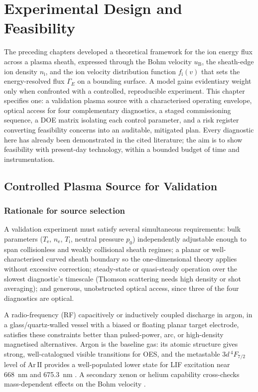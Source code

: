 \chapter{Experimental Design and Feasibility}
\label{ch:experiment}

The preceding chapters developed a theoretical framework for the ion energy flux across a plasma sheath, expressed through the Bohm velocity $u_{\mathrm{B}}$, the sheath-edge ion density $n_{\mathrm{i}}$, and the ion velocity distribution function $f_{\mathrm{i}}(v)$ that sets the energy-resolved flux $\Gamma_{E}$ on a bounding surface. A model gains evidentiary weight only when confronted with a controlled, reproducible experiment. This chapter specifies one: a validation plasma source with a characterised operating envelope, optical access for four complementary diagnostics, a staged commissioning sequence, a DOE matrix isolating each control parameter, and a risk register converting feasibility concerns into an auditable, mitigated plan. Every diagnostic here has already been demonstrated in the cited literature; the aim is to show feasibility with present-day technology, within a bounded budget of time and instrumentation.

\section{Controlled Plasma Source for Validation}

\subsection{Rationale for source selection}

A validation experiment must satisfy several simultaneous requirements: bulk parameters ($T_{\mathrm{e}}$, $n_{\mathrm{e}}$, $T_{\mathrm{i}}$, neutral pressure $p_{0}$) independently adjustable enough to span collisionless and weakly collisional sheath regimes; a planar or well-characterised curved sheath boundary so the one-dimensional theory applies without excessive correction; steady-state or quasi-steady operation over the slowest diagnostic's timescale (Thomson scattering needs high density or shot averaging); and generous, unobstructed optical access, since three of the four diagnostics are optical.

A radio-frequency (RF) capacitively or inductively coupled discharge in argon, in a glass/quartz-walled vessel with a biased or floating planar target electrode, satisfies these constraints better than pulsed-power, arc, or high-density magnetised alternatives. Argon is the baseline gas: its atomic structure gives strong, well-catalogued visible transitions for OES, and the metastable $3d\,^{4}\!F_{7/2}$ level of $\mathrm{Ar\,II}$ provides a well-populated lower state for LIF excitation near \SI{668}{\nano\meter} and \SI{675.3}{\nano\meter} \cite{ref0292,ref0300}. A secondary xenon or helium capability cross-checks mass-dependent effects on the Bohm velocity \cite{ref0322}.

